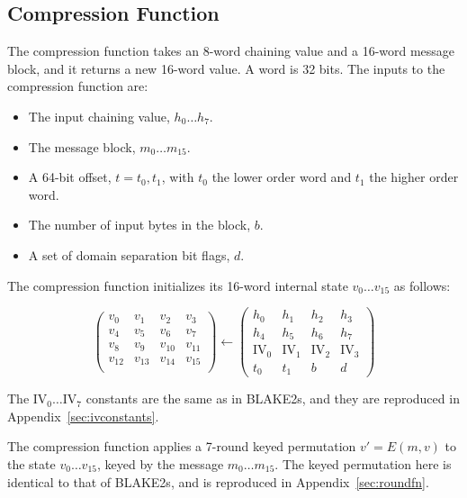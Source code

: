 \documentclass[12pt,notitlepage,a4paper]{article}
\newcommand{\IV}{\text{IV}}
\begin{document}
\subsection{Compression Function}\label{sec:compression}

The compression function takes an 8-word chaining value and a 16-word message
block, and it returns a new 16-word value. A word is 32 bits. The inputs to
the compression function are:

\begin{itemize}
    \item The input chaining value, $h_{0} \ldots h_{7}$.
    \item The message block, $m_{0} \ldots m_{15}$.
    \item A 64-bit offset, $t=t_{0},t_{1}$, with $t_{0}$ the lower order word
        and $t_{1}$ the higher order word.
    \item The number of input bytes in the block, $b$.
    \item A set of domain separation bit flags, $d$.
\end{itemize}

The compression function initializes its 16-word internal state $v_{0} \ldots
v_{15}$ as follows: 

\begin{equation*}
\begin{pmatrix}
v_{0} & v_{1} & v_{2} & v_{3} \\
v_{4} & v_{5} & v_{6} & v_{7} \\
v_{8} & v_{9} & v_{10} & v_{11} \\
v_{12} & v_{13} & v_{14} & v_{15} \\
\end{pmatrix}
\leftarrow
\begin{pmatrix}
h_{0} & h_{1} & h_{2} & h_{3} \\
h_{4} & h_{5} & h_{6} & h_{7} \\
\IV_{0} & \IV_{1} & \IV_{2} & \IV_{3} \\
t_{0} & t_{1} & b & d 
\end{pmatrix}
\end{equation*}

The $\IV_{0} \ldots \IV_{7}$ constants are the same as in
BLAKE2s, and they are reproduced in Appendix~\ref{sec:ivconstants}.

The compression function applies a 7-round keyed permutation $v' = E(m, v)$ to
the state $v_0 \dots v_{15}$, keyed by the message $m_0 \dots m_{15}$. The
keyed permutation here is identical to that of BLAKE2s, and is
reproduced in Appendix~\ref{sec:roundfn}.
\end{document}

